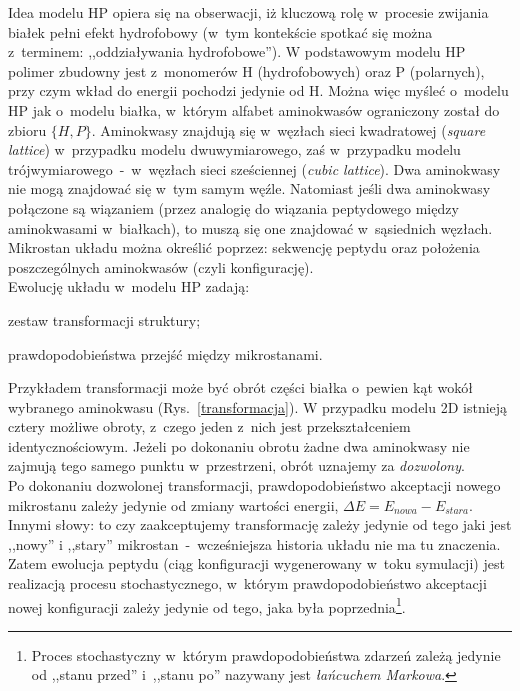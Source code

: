\documentclass[a4paper,11pt,twoside]{book}
\newenvironment{packed_enum}{
\begin{enumerate}
  \setlength{\itemsep}{1pt}
  \setlength{\parskip}{0pt}
  \setlength{\parsep}{0pt}
}{\end{enumerate}}
\begin{document}
Idea modelu HP opiera się na obserwacji, iż kluczową rolę w~procesie zwijania białek pełni efekt hydrofobowy (w~tym kontekście spotkać się można z~terminem: ,,oddziaływania hydrofobowe''). W podstawowym modelu HP polimer zbudowny jest z~monomerów H (hydrofobowych) oraz P (polarnych), przy czym wkład do energii pochodzi jedynie od H. Można więc myśleć o~modelu HP jak o~modelu białka, w~którym alfabet aminokwasów ograniczony został do zbioru $\{H, P \}$. Aminokwasy znajdują się w~węzłach sieci kwadratowej (\emph{square lattice}) w~przypadku modelu dwuwymiarowego, zaś w~przypadku modelu trójwymiarowego~-~w~węzłach sieci sześciennej (\emph{cubic lattice}). Dwa aminokwasy nie mogą znajdować się w~tym samym węźle. Natomiast jeśli dwa aminokwasy połączone są wiązaniem (przez analogię do wiązania peptydowego między aminokwasami w~białkach), to muszą się one znajdować w~sąsiednich węzłach. Mikrostan układu można określić poprzez: sekwencję peptydu oraz położenia poszczególnych aminokwasów (czyli konfigurację).\\

Ewolucję układu w~modelu HP zadają:
\begin{packed_enum}
\item zestaw transformacji struktury;
\item prawdopodobieństwa przejść między mikrostanami.
\end{packed_enum}
Przykładem transformacji może być obrót części białka o~pewien kąt wokół wybranego aminokwasu (Rys.~\ref{transformacja}). W przypadku modelu 2D istnieją cztery możliwe obroty, z~czego jeden z~nich jest przekształceniem identycznościowym. Jeżeli po dokonaniu obrotu żadne dwa aminokwasy nie zajmują tego samego punktu w~przestrzeni, obrót uznajemy za \emph{dozwolony}.\\

Po dokonaniu dozwolonej transformacji, prawdopodobieństwo akceptacji nowego mikrostanu zależy jedynie od zmiany wartości energii, $\Delta E = E_{nowa} −E_{stara}$. Innymi słowy: to czy zaakceptujemy transformację zależy jedynie od tego jaki jest ,,nowy'' i ,,stary'' mikrostan~-~wcześniejsza historia układu nie ma tu znaczenia. Zatem ewolucja peptydu (ciąg konfiguracji wygenerowany w~toku symulacji) jest realizacją procesu stochastycznego, w~którym prawdopodobieństwo akceptacji nowej konfiguracji zależy jedynie od tego, jaka była poprzednia\footnote{Proces stochastyczny w~którym prawdopodobieństwa zdarzeń zależą jedynie od ,,stanu przed'' i~,,stanu po'' nazywany jest \emph{łańcuchem Markowa}.}.\\
\end{document}
